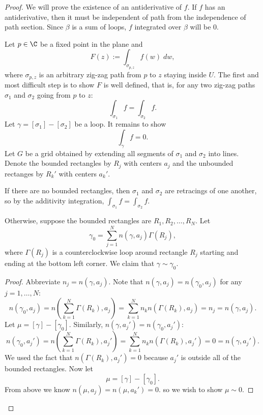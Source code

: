\begin{proof}
    We will prove the existence of an antiderivative of $f$.
    If $f$ has an antiderivative, then it must be independent
    of path from the independence of path section.
    Since $\beta$ is a sum of loops, $f$ integrated over $\beta$
    will be $0$.

    \noindent
    Let $p \in \C$ be a fixed point in the plane and 
    \[ F(z) := \int_{\sigma_{p, z}} f(w) \; dw, \]
    where $\sigma_{p, z}$ is an arbitrary zig-zag path from
    $p$ to $z$ staying inside $U$.
    The first and most difficult step is to show $F$ is well
    defined, that is, for any two zig-zag paths $\sigma_1$
    and $\sigma_2$ going from $p$ to $z$:
    \[ \int_{\sigma_1} f = \int_{\sigma_2} f. \]
    Let $\gamma = [\sigma_1] - [\sigma_2]$ be a loop.
    It remains to show
    \[ \int_{\gamma} f = 0. \]
    Let $G$ be a grid obtained by extending all segments of $\sigma_1$ 
    and $\sigma_2$ into lines.
    Denote the bounded rectangles by $R_j$ with centers $a_j$
    and the unbounded rectanges by $R_k'$ with centers $a_k'$.

    If there are no bounded rectangles, then $\sigma_1$ and
    $\sigma_2$ are retracings of one another, so by the
    additivity integration, $\int_{\sigma_1} f = \int_{\sigma_2}
    f$.

    Otherwise, suppose the bounded rectangles are $R_1, R_2, 
    \ldots, R_N$.
    Let
    \[ \gamma_0 = \sum_{j=1}^N n(\gamma, a_j) \Gamma(R_j), \]
    where $\Gamma(R_j)$ is a counterclockwise loop around
    rectangle $R_j$ starting and ending at the bottom left 
    corner.
    We claim that $\gamma \sim \gamma_0$.
    \begin{proof}
        Abbreviate $n_j = n(\gamma, a_j)$.
        Note that $n(\gamma, a_j) = n(\gamma_0, a_j)$ for
        any $j = 1, \ldots, N$:
        \[ n(\gamma_0, a_j) = n\left( \sum_{k=1}^N \Gamma(R_k),
            a_j \right)
        = \sum_{k=1}^N n_k n(\Gamma(R_k), a_j)
        = n_j = n(\gamma, a_j). \]
        Let $\mu = [\gamma] - [\gamma_0]$.
        Similarly, $n(\gamma, a_j') = n(\gamma_0, a_j')$:
        \[ n(\gamma_0, a_j') = n\left( \sum_{k=1}^N \Gamma(R_k),
            a_j' \right)
        = \sum_{k=1}^N n_k n(\Gamma(R_k), a_j')
        = 0 = n(\gamma, a_j'). \]
        We used the fact that
        $n(\Gamma(R_k), a_j') = 0$ because $a_j'$
        is outside all of the bounded rectangles.
        Now let 
        \[ \mu = [\gamma] - [\gamma_0]. \]
        From above we know $n(\mu, a_j) = n(\mu, a_k') = 0$.
        so we wish to show $\mu \sim 0$.


\end{proof}
\end{proof}
